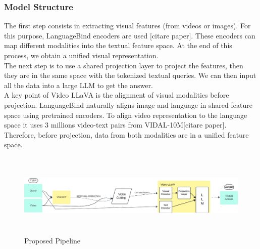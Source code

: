 \documentclass[conference]{IEEEtran}
\begin{document}
\subsubsection{Model Structure}
The first step consists in extracting visual features (from videos or images). For this purpose, LanguageBind encoders are used [citare paper]. These encoders can map different modalities into the textual feature space. At the end of this process, we obtain a unified visual representation.\\ 
The next step is to use a shared projection layer to project the features, then they are in the same space with the tokenized textual queries. We can then input all the data into a large LLM to get the answer.\\
A key point of Video LLaVA is the alignment of visual modalities before projection. LanguageBind naturally aligns image and language in shared feature space using pretrained encoders. To align video representation to the language space it uses 3 millions video-text pairs from VIDAL-10M[citare paper]. Therefore, before projection, data from both modalities are in a unified feature space.

\begin{figure}
  \includegraphics[width=\textwidth,height=4cm]{ProposedPipeLine-removebg-preview.png}
  \caption{Proposed Pipeline}
\end{figure}
\end{document}
